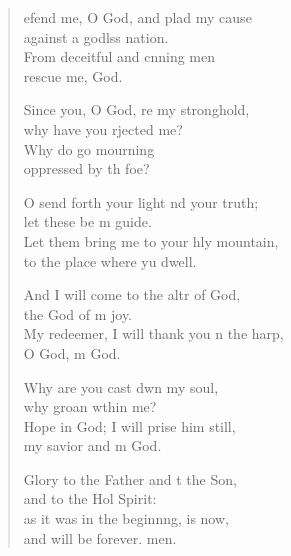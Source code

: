 \settowidth{\versewidth}{My redeemer, I will thank you on the harp, *}
\begin{verse}%
  \begin{patverse}
    efend me, O God, and plad my cause\Med\\
against a godlss nation.\\
From deceitful and cnning men\Med\\
rescue me,  God.

Since you, O God, re my stronghold,\Med\\
why have you rjected me?\\
Why do  go mourning\Med\\
oppressed by th foe?

O send forth your light nd your truth;\Med\\
let these be m guide.\\
Let them bring me to your hly mountain,\Med\\
to the place where yu dwell.

And I will come to the altr of God,\Med\\
the God of m joy.\\
My redeemer, I will thank you n the harp,\Med\\
O God, m God.

Why are you cast dwn my soul,\Med\\
why groan w\pointup{\i}thin me?\\
Hope in God; I will prise him still,\Med\\
my savior and m God.

Glory to the Father and t the Son,\Med\\
and to the Hol Spirit:\\
as it was in the beginn\pointup{\i}ng, is now,\Med\\
and will be forever. men.
  \end{patverse}
\end{verse}
